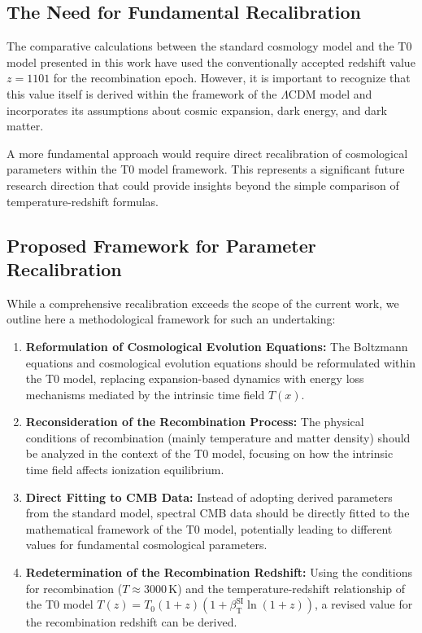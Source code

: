 \documentclass[12pt,a4paper]{article}
\newcommand{\Tfield}{T(x)}
\newcommand{\betaT}{\beta_{\text{T}}}
\begin{document}
	\subsection{The Need for Fundamental Recalibration}
	\label{subsec:need_recalibration}
	
	The comparative calculations between the standard cosmology model and the T0 model presented in this work have used the conventionally accepted redshift value $z = 1101$ for the recombination epoch. However, it is important to recognize that this value itself is derived within the framework of the $\Lambda$CDM model and incorporates its assumptions about cosmic expansion, dark energy, and dark matter.
	
	A more fundamental approach would require direct recalibration of cosmological parameters within the T0 model framework. This represents a significant future research direction that could provide insights beyond the simple comparison of temperature-redshift formulas.
	
	\subsection{Proposed Framework for Parameter Recalibration}
	\label{subsec:recalibration_framework}
	
	While a comprehensive recalibration exceeds the scope of the current work, we outline here a methodological framework for such an undertaking:
	
	\begin{enumerate}
		\item \textbf{Reformulation of Cosmological Evolution Equations:} The Boltzmann equations and cosmological evolution equations should be reformulated within the T0 model, replacing expansion-based dynamics with energy loss mechanisms mediated by the intrinsic time field $\Tfield$.
		
		\item \textbf{Reconsideration of the Recombination Process:} The physical conditions of recombination (mainly temperature and matter density) should be analyzed in the context of the T0 model, focusing on how the intrinsic time field affects ionization equilibrium.
		
		\item \textbf{Direct Fitting to CMB Data:} Instead of adopting derived parameters from the standard model, spectral CMB data should be directly fitted to the mathematical framework of the T0 model, potentially leading to different values for fundamental cosmological parameters.
		
		\item \textbf{Redetermination of the Recombination Redshift:} Using the conditions for recombination ($T \approx 3000 \, \text{K}$) and the temperature-redshift relationship of the T0 model $T(z) = T_0 (1+z)(1+\betaT^{\text{SI}} \ln(1+z))$, a revised value for the recombination redshift can be derived.
	\end{enumerate}
	
\end{document}
